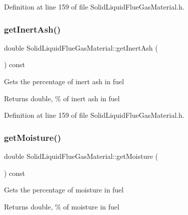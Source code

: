 Definition at line 159 of file Solid\+Liquid\+Flue\+Gas\+Material.\+h.

\mbox{\label{class_solid_liquid_flue_gas_material_a0549b32b7b5423267d5f59cc96b98127}} 
\subsubsection{\texorpdfstring{get\+Inert\+Ash()}{getInertAsh()}\hspace{0.1cm}{\footnotesize\ttfamily [3/3]}}
{\footnotesize\ttfamily double Solid\+Liquid\+Flue\+Gas\+Material\+::get\+Inert\+Ash (\begin{DoxyParamCaption}{ }\end{DoxyParamCaption}) const\hspace{0.3cm}{\ttfamily [inline]}}

Gets the percentage of inert ash in fuel \begin{DoxyReturn}{Returns}
double, \% of inert ash in fuel 
\end{DoxyReturn}


Definition at line 159 of file Solid\+Liquid\+Flue\+Gas\+Material.\+h.

\mbox{\label{class_solid_liquid_flue_gas_material_accf3c8be942d0ba244f6eabab6e7012b}} 
\subsubsection{\texorpdfstring{get\+Moisture()}{getMoisture()}\hspace{0.1cm}{\footnotesize\ttfamily [1/3]}}
{\footnotesize\ttfamily double Solid\+Liquid\+Flue\+Gas\+Material\+::get\+Moisture (\begin{DoxyParamCaption}{ }\end{DoxyParamCaption}) const\hspace{0.3cm}{\ttfamily [inline]}}

Gets the percentage of moisture in fuel \begin{DoxyReturn}{Returns}
double, \% of moisture in fuel 
\end{DoxyReturn}


